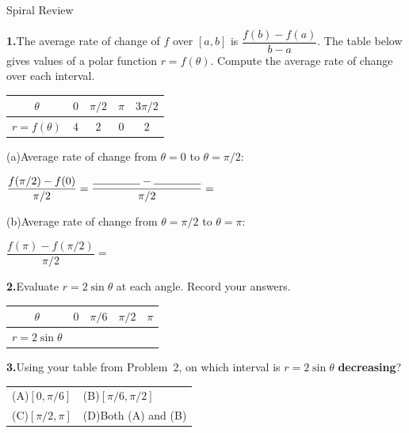 \documentclass[10pt]{article}
\begin{document}
\namedateperiod

\vspace{0.12in}

\begin{notesbox}{Spiral Review}

\textbf{1.}\quad The average rate of change of $f$ over $[a, b]$ is
$\dfrac{f(b) - f(a)}{b - a}$.
The table below gives values of a polar function $r = f(\theta)$.
Compute the average rate of change over each interval.

\vspace{6pt}
\renewcommand{\arraystretch}{1.5}
\begin{tabular}{|c|c|c|c|c|}
\hline
$\theta$ & $0$ & $\pi/2$ & $\pi$ & $3\pi/2$ \\
\hline
$r = f(\theta)$ & $4$ & $2$ & $0$ & $2$ \\
\hline
\end{tabular}

\vspace{8pt}
(a)\quad Average rate of change from $\theta = 0$ to $\theta = \pi/2$:

\vspace{4pt}
$\dfrac{f(\pi/2) - f(0)}{\pi/2} = \dfrac{\rule{1.5cm}{0.4pt} - \rule{1.5cm}{0.4pt}}{\pi/2} = $ \blank{2.8cm}

\vspace{6pt}
(b)\quad Average rate of change from $\theta = \pi/2$ to $\theta = \pi$:

\vspace{4pt}
$\dfrac{f(\pi) - f(\pi/2)}{\pi/2} = $ \blank{3.2cm}

\vspace{0.14in}
\textbf{2.}\quad Evaluate $r = 2\sin\theta$ at each angle. Record your answers.

\vspace{6pt}
\renewcommand{\arraystretch}{1.6}
\begin{tabular}{|c|c|c|c|c|}
\hline
$\theta$ & $0$ & $\pi/6$ & $\pi/2$ & $\pi$ \\
\hline
$r = 2\sin\theta$ & \phantom{0.000} & \phantom{0.000} & \phantom{0.000} & \phantom{0.000} \\
\hline
\end{tabular}

\vspace{0.14in}
\textbf{3.}\quad Using your table from Problem~2, on which interval is
$r = 2\sin\theta$ \textbf{decreasing}?

\vspace{4pt}
\begin{tabular}{ll}
(A)\quad $[0, \pi/6]$ \qquad\qquad & (B)\quad $[\pi/6, \pi/2]$ \\[4pt]
(C)\quad $[\pi/2, \pi]$ & (D)\quad Both (A) and (B) \\
\end{tabular}


\end{notesbox}
\end{document}
